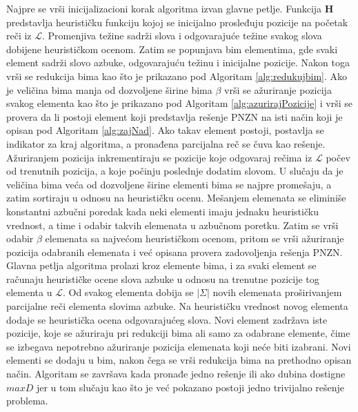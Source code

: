 \documentclass[12pt,oneside]{memoir}
\begin{document}
Najpre se vrši inicijalizacioni korak algoritma izvan glavne petlje.
Funkcija $\textbf{H}$ predstavlja heurističku funkciju kojoj se inicijalno prosleđuju
pozicije na početak reči iz $\mathcal{L}$. Promenjiva težine sadrži slova i odgovarajuće
težine svakog slova dobijene heurističkom ocenom. Zatim se popunjava bim elementima, gde 
svaki element sadrži slovo azbuke, odgovarajuću težinu
i inicijalne pozicije. Nakon toga vrši se redukcija bima 
kao što je prikazano pod Algoritam \ref{alg:redukujbim}. Ako je veličina bima manja od
dozvoljene širine bima $\beta$ vrši se ažuriranje pozicija svakog elementa kao što je prikazano
pod Algoritam \ref{alg:azurirajPozicije} i vrši se provera da li postoji element koji predstavlja
rešenje PNZN na isti način koji je opisan pod Algoritam \ref{alg:zajNad}.
Ako takav element postoji, postavlja se indikator za kraj algoritma, a pronađena
parcijalna reč se čuva kao rešenje. Ažuriranjem pozicija inkrementiraju se pozicije koje odgovaraj
rečima iz $\mathcal{L}$ počev od trenutnih pozicija, a koje počinju poslednje dodatim slovom.
U slučaju da je veličina bima veća od dozvoljene širine elementi bima se najpre promešaju, a zatim
sortiraju u odnosu na heurističku ocenu. Mešanjem elemenata se eliminiše konstantni azbučni 
poredak kada neki elementi imaju jednaku heurističku vrednost, a time i odabir 
takvih elemenata u azbučnom poretku. Zatim se vrši odabir $\beta$ elemenata sa najvećom 
heurističkom ocenom, pritom se vrši ažuriranje pozicija odabranih elemenata i već opisana
provera zadovoljenja rešenja PNZN. Glavna petlja algoritma prolazi kroz elemente bima, 
i za svaki element se računaju heurističke ocene slova azbuke u odnosu na trenutne pozicije
tog elementa u $\mathcal{L}$. Od svakog elementa dobija se $|\Sigma|$ novih elemenata
proširivanjem parcijalne reči elementa slovima azbuke. Na heurističku vrednost novog elementa
dodaje se heuristička ocena odgovarajućeg slova. Novi element zadržava iste pozicije,
koje se ažuriraju pri redukciji bima ali samo za odabrane elemente, čime se 
izbegava nepotrebno ažuriranje pozicija elemenata koji neće biti izabrani.
Novi elementi se dodaju u bim, nakon čega se vrši redukcija bima na prethodno
opisan način. Algoritam se završava kada pronađe jedno rešenje ili
ako dubina dostigne $maxD$ jer u tom slučaju kao što je već pokazano postoji
jedno trivijalno rešenje problema.
\end{document}
